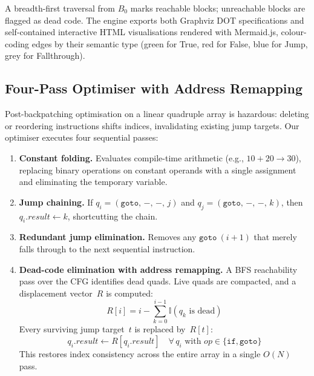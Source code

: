 \documentclass[conference]{IEEEtran}
\begin{document}
A breadth-first traversal from $B_0$ marks reachable blocks; unreachable blocks are flagged as dead code. The engine exports both Graphviz DOT specifications and self-contained interactive HTML visualisations rendered with Mermaid.js, colour-coding edges by their semantic type (green for True, red for False, blue for Jump, grey for Fallthrough).

\subsection{Four-Pass Optimiser with Address Remapping}
\label{sec:opt}

Post-backpatching optimisation on a linear quadruple array is hazardous: deleting or reordering instructions shifts indices, invalidating existing jump targets. Our optimiser executes four sequential passes:

\begin{enumerate}[leftmargin=*]
\item \textbf{Constant folding.} Evaluates compile-time arithmetic (e.g., $10+20 \to 30$), replacing binary operations on constant operands with a single assignment and eliminating the temporary variable.
\item \textbf{Jump chaining.} If $q_i = (\texttt{goto},\,-,\,-,\,j)$ and $q_j = (\texttt{goto},\,-,\,-,\,k)$, then $q_i.\mathit{result} \leftarrow k$, shortcutting the chain.
\item \textbf{Redundant jump elimination.} Removes any $\texttt{goto}~(i{+}1)$ that merely falls through to the next sequential instruction.
\item \textbf{Dead-code elimination with address remapping.} A BFS reachability pass over the CFG identifies dead quads. Live quads are compacted, and a displacement vector~$R$ is computed:
\begin{equation}
\label{eq:remap}
R[i] = i - \sum_{k=0}^{i-1}\mathbb{I}(q_k \text{ is dead})
\end{equation}
Every surviving jump target~$t$ is replaced by~$R[t]$:
\begin{equation}
\label{eq:apply_remap}
q_i.\mathit{result} \leftarrow R[q_i.\mathit{result}] \quad \forall\, q_i \text{ with } \mathit{op} \in \{\texttt{if}, \texttt{goto}\}
\end{equation}
This restores index consistency across the entire array in a single $O(N)$ pass.
\end{enumerate}

\end{document}
